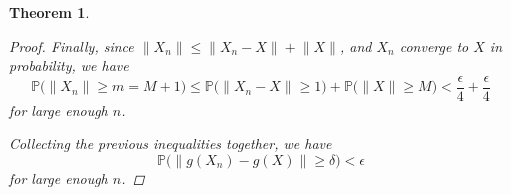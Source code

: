 \documentclass[12pt]{article}
\newcommand{\PP}{\mathbb{P}}
\providecommand{\norm}[1]{\lVert#1\rVert}
\newtheorem{thm}{Theorem}
\begin{document}
\begin{thm}
\begin{proof}
Finally, since $\norm{X_n} \leq \norm{X_n - X} + \norm{X}$,
and $X_n$ converge to $X$ in probability,
we have
\[
\PP\bigl( \norm{X_n} \geq m = M+1 \bigr)
\leq \PP \bigl( \norm{X_n - X} \geq 1 \bigr) + \PP\bigl( \norm{X} \geq M \bigr)
< \frac{\epsilon}{4} + \frac{\epsilon}{4}
\]
for large enough $n$.

Collecting the previous inequalities together,
we have 
\[
\PP\bigl(\norm{g(X_n) - g(X)} \geq \delta \bigr) < \epsilon
\]
for large enough $n$.
\end{proof}

\end{thm}

\end{document}
